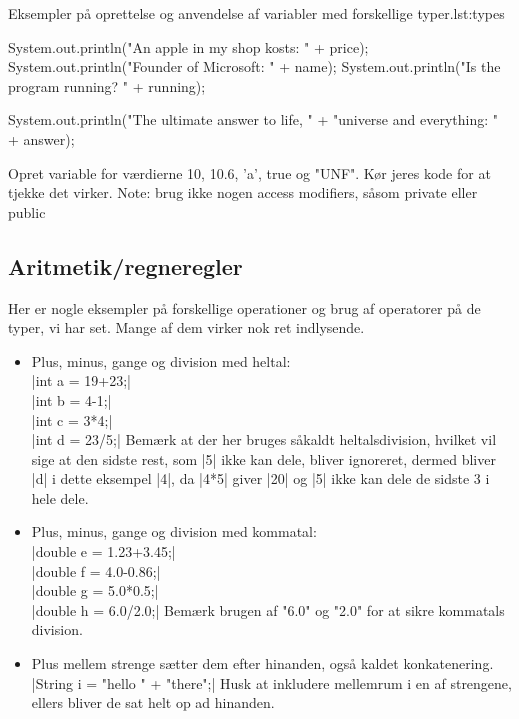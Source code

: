 {\begin{JavaCode}{Eksempler på oprettelse og anvendelse af variabler med forskellige typer.}{lst:types}
{{			System.out.println("An apple in my shop kosts: " 
						+ price);
			System.out.println("Founder of Microsoft: " + name);
			System.out.println("Is the program running? " 
						+ running);
			
			System.out.println("The ultimate answer to life, "
						+ "universe and everything: " 
						+ answer);
		}
	}
\end{JavaCode}

\begin{exercise}
	Opret variable for værdierne 10, 10.6, 'a', true og "UNF". Kør jeres kode for at tjekke det virker.
	Note: brug ikke nogen access modifiers, såsom private eller public
\end{exercise}

\subsection{Aritmetik/regneregler}
Her er nogle eksempler på forskellige operationer og brug af operatorer på de typer, vi har set. Mange af dem virker nok ret indlysende.

\begin{itemize}
	\item Plus, minus, gange og division med heltal: \\
	\JavaInline|int a = 19+23;| \\
	\JavaInline|int b = 4-1;| \\
	\JavaInline|int c = 3*4;| \\
	\JavaInline|int d = 23/5;| Bemærk at der her bruges såkaldt heltalsdivision, hvilket vil sige at den sidste rest, som \JavaInline|5| ikke kan dele, bliver ignoreret, dermed bliver \JavaInline|d| i dette eksempel \JavaInline|4|, da \JavaInline|4*5| giver \JavaInline|20| og \JavaInline|5| ikke kan dele de sidste 3 i hele dele.
	
	\item Plus, minus, gange og division med kommatal:\\
	\JavaInline|double e = 1.23+3.45;|\\
	\JavaInline|double f = 4.0-0.86;|\\
	\JavaInline|double g = 5.0*0.5;|\\
	\JavaInline|double h = 6.0/2.0;| Bemærk brugen af "6.0" og "2.0" for at sikre kommatals division.
	
	\item Plus mellem strenge sætter dem efter hinanden, også kaldet konkatenering.\\
	\JavaInline|String i = "hello " + "there";| Husk at inkludere mellemrum i en af strengene, ellers bliver de sat helt op ad hinanden.
	

\end{itemize}}
